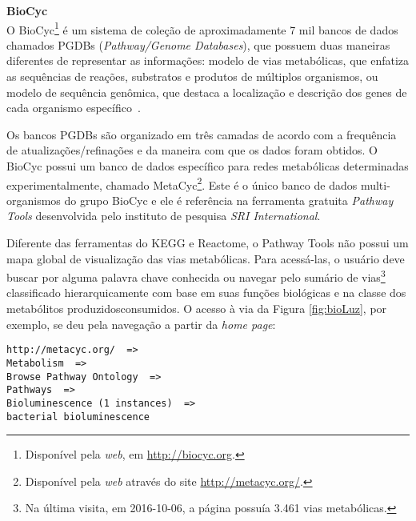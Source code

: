 \break


\textbf{BioCyc} \\

\indent O BioCyc\footnote{Disponível pela \textit{web}, em \url{http://biocyc.org}.} é um sistema de coleção de aproximadamente 7 mil bancos de dados chamados PGDBs (\textit{Pathway/Genome Databases}), que possuem duas maneiras diferentes de representar as informações: modelo de vias metabólicas, que enfatiza as sequências de reações, substratos e produtos de múltiplos organismos, ou modelo de sequência genômica, que destaca a localização e descrição dos genes de cada organismo específico~\cite{biocycIntro}. 

\indent Os bancos PGDBs são organizado em três camadas de acordo com a frequência de atualizações/refinações e da maneira com que os dados foram obtidos. O BioCyc possui um banco de dados específico para redes metabólicas determinadas experimentalmente, chamado MetaCyc\footnote{Disponível pela \textit{web} através do site \url{http://metacyc.org/}.}. Este é o único banco de dados multi-organismos do grupo BioCyc e ele é referência na ferramenta gratuita \textit{Pathway Tools} desenvolvida pelo instituto de pesquisa \textit{SRI International}.

\indent Diferente das ferramentas do KEGG e Reactome, o Pathway  Tools não possui um mapa global de visualização das vias metabólicas. Para acessá-las, o usuário deve buscar por alguma palavra chave conhecida ou navegar pelo sumário de vias\footnote{Na última visita, em 2016-10-06, a página possuía 3.461 vias metabólicas.} classificado hierarquicamente com base em suas funções biológicas e na classe dos metabólitos produzidos\/consumidos. O acesso à via da Figura \ref{fig:bioLuz}, por exemplo, se deu pela navegação a partir da \textit{home page}: \\

\begin{lstlisting}[frame=single] 
http://metacyc.org/  =>
Metabolism  =>
Browse Pathway Ontology  =>
Pathways  =>
Bioluminescence (1 instances)  =>
bacterial bioluminescence
\end{lstlisting}

